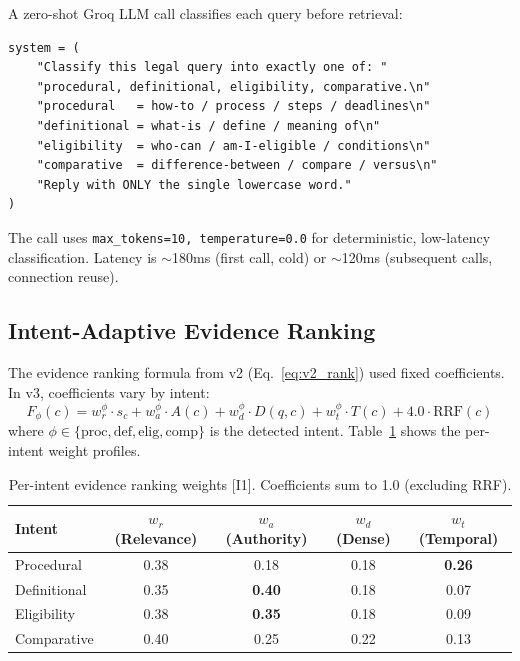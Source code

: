 \documentclass[12pt,a4paper]{article}
\begin{document}
A zero-shot Groq LLM call classifies each query before retrieval:

\begin{lstlisting}[style=pythonstyle,caption={Query intent classification prompt.}]
system = (
    "Classify this legal query into exactly one of: "
    "procedural, definitional, eligibility, comparative.\n"
    "procedural   = how-to / process / steps / deadlines\n"
    "definitional = what-is / define / meaning of\n"
    "eligibility  = who-can / am-I-eligible / conditions\n"
    "comparative  = difference-between / compare / versus\n"
    "Reply with ONLY the single lowercase word."
)
\end{lstlisting}

The call uses \texttt{max\_tokens=10, temperature=0.0} for deterministic,
low-latency classification. Latency is $\sim$180ms (first call, cold) or
$\sim$120ms (subsequent calls, connection reuse).

\subsection{Intent-Adaptive Evidence Ranking}

The evidence ranking formula from v2 (Eq.~\ref{eq:v2_rank}) used fixed
coefficients. In v3, coefficients vary by intent:
\begin{equation}
F_{\phi}(c) = w^\phi_r \cdot s_c + w^\phi_a \cdot A(c) + w^\phi_d \cdot D(q,c)
           + w^\phi_t \cdot T(c) + 4.0 \cdot \text{RRF}(c)
\label{eq:intent_rank}
\end{equation}
where $\phi \in \{\text{proc}, \text{def}, \text{elig}, \text{comp}\}$ is the
detected intent. Table~\ref{tab:intent_weights} shows the per-intent weight profiles.

\begin{table}[H]
\centering
\caption{Per-intent evidence ranking weights [I1]. Coefficients sum to 1.0 (excluding RRF).}
\label{tab:intent_weights}
\begin{tabular}{lcccc}
\toprule
\textbf{Intent} & $w_r$ (Relevance) & $w_a$ (Authority) & $w_d$ (Dense) & $w_t$ (Temporal) \\
\midrule
Procedural   & 0.38 & 0.18 & 0.18 & \textbf{0.26} \\
Definitional & 0.35 & \textbf{0.40} & 0.18 & 0.07 \\
Eligibility  & 0.38 & \textbf{0.35} & 0.18 & 0.09 \\
Comparative  & 0.40 & 0.25 & 0.22 & 0.13 \\
\bottomrule
\end{tabular}
\end{table}
\end{document}
